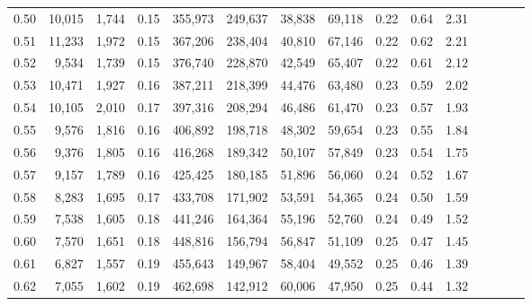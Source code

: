 \begin{tabular}{rrrcrrrrrrrrrrr}
0.50 &  10,015 &  1,744 &                                       0.15 &  355,973 &  249,637 &   38,838 &   69,118 &  0.22 &  0.64 &                         2.31 \\
0.51 &  11,233 &  1,972 &                                       0.15 &  367,206 &  238,404 &   40,810 &   67,146 &  0.22 &  0.62 &                         2.21 \\
0.52 &   9,534 &  1,739 &                                       0.15 &  376,740 &  228,870 &   42,549 &   65,407 &  0.22 &  0.61 &                         2.12 \\
0.53 &  10,471 &  1,927 &                                       0.16 &  387,211 &  218,399 &   44,476 &   63,480 &  0.23 &  0.59 &                         2.02 \\
0.54 &  10,105 &  2,010 &                                       0.17 &  397,316 &  208,294 &   46,486 &   61,470 &  0.23 &  0.57 &                         1.93 \\
0.55 &   9,576 &  1,816 &                                       0.16 &  406,892 &  198,718 &   48,302 &   59,654 &  0.23 &  0.55 &                         1.84 \\
0.56 &   9,376 &  1,805 &                                       0.16 &  416,268 &  189,342 &   50,107 &   57,849 &  0.23 &  0.54 &                         1.75 \\
0.57 &   9,157 &  1,789 &                                       0.16 &  425,425 &  180,185 &   51,896 &   56,060 &  0.24 &  0.52 &                         1.67 \\
0.58 &   8,283 &  1,695 &                                       0.17 &  433,708 &  171,902 &   53,591 &   54,365 &  0.24 &  0.50 &                         1.59 \\
0.59 &   7,538 &  1,605 &                                       0.18 &  441,246 &  164,364 &   55,196 &   52,760 &  0.24 &  0.49 &                         1.52 \\
0.60 &   7,570 &  1,651 &                                       0.18 &  448,816 &  156,794 &   56,847 &   51,109 &  0.25 &  0.47 &                         1.45 \\
0.61 &   6,827 &  1,557 &                                       0.19 &  455,643 &  149,967 &   58,404 &   49,552 &  0.25 &  0.46 &                         1.39 \\
0.62 &   7,055 &  1,602 &                                       0.19 &  462,698 &  142,912 &   60,006 &   47,950 &  0.25 &  0.44 &                         1.32 \\

\end{tabular}
